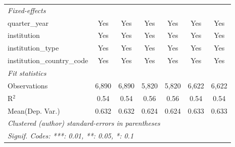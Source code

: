 \begin{tabular}{lcccccc}
   \midrule
   \emph{Fixed-effects}\\
   quarter\_year                      & Yes     & Yes         & Yes     & Yes            & Yes     & Yes\\  
   institution                        & Yes     & Yes         & Yes     & Yes            & Yes     & Yes\\  
   institution\_type                  & Yes     & Yes         & Yes     & Yes            & Yes     & Yes\\  
   institution\_country\_code         & Yes     & Yes         & Yes     & Yes            & Yes     & Yes\\  
   \midrule
   \emph{Fit statistics}\\
   Observations                       & 6,890   & 6,890       & 5,820   & 5,820          & 6,622   & 6,622\\  
   R$^2$                              & 0.54    & 0.54        & 0.56    & 0.56           & 0.54    & 0.54\\  
Mean(Dep. Var.) & 0.632 & 0.632 & 0.624 & 0.624 & 0.633 & 0.633 \\
   \midrule \midrule
   \multicolumn{7}{l}{\emph{Clustered (author) standard-errors in parentheses}}\\
   \multicolumn{7}{l}{\emph{Signif. Codes: ***: 0.01, **: 0.05, *: 0.1}}\\
\end{tabular}
\par\endgroup
